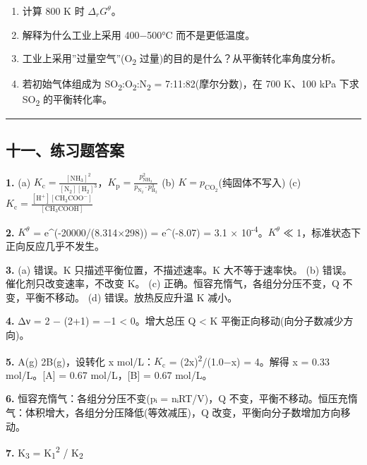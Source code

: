 \begin{enumerate}
\def\labelenumi{(\alph{enumi})}
\tightlist
\item
  计算 800 K 时 \(\Delta_r G^\theta\)。
\item
  解释为什么工业上采用 400−500°C 而不是更低温度。
\item
  工业上采用''过量空气''(O\textsubscript{2} 过量)的目的是什么？从平衡转化率角度分析。
\item
  若初始气体组成为 SO\textsubscript{2}:O\textsubscript{2}:N\textsubscript{2} = 7:11:82(摩尔分数)，在 700 K、100 kPa 下求 SO\textsubscript{2} 的平衡转化率。
\end{enumerate}

\begin{center}\rule{0.5\linewidth}{0.5pt}\end{center}

\subsection{十一、练习题答案}\label{ux5341ux4e00ux7ec3ux4e60ux9898ux7b54ux6848}

\textbf{1.}
(a) \(K_{\mathrm c} = \frac{[\mathrm{NH_3}]^2}{[\mathrm{N_2}][\mathrm{H_2}]^3}\)，\(K_{\mathrm p} = \frac{p_{\mathrm{NH_3}}^2}{p_{\mathrm{N_2}} \cdot p_{\mathrm{H_2}}^3}\)
(b) \(K = p_{\mathrm{CO_2}}\)(纯固体不写入)
(c) \(K_{\mathrm c} = \frac{[\mathrm{H^+}][\mathrm{CH_3COO^-}]}{[\mathrm{CH_3COOH}]}\)

\textbf{2.} \(K^\theta\) = e\^{}(-20000/(8.314×298)) = e\^{}(-8.07) = 3.1 × 10\textsuperscript{-4}。\(K^\theta\) ≪ 1，标准状态下正向反应几乎不发生。

\textbf{3.}
(a) 错误。K 只描述平衡位置，不描述速率。K 大不等于速率快。
(b) 错误。催化剂只改变速率，不改变 K。
(c) 正确。恒容充惰气，各组分分压不变，Q 不变，平衡不移动。
(d) 错误。放热反应升温 K 减小。

\textbf{4.} Δν = 2 − (2+1) = −1 \textless{} 0。增大总压 \箭 Q \textless{} K \箭 平衡正向移动(向分子数减少方向)。

\textbf{5.} A(g) \衡 2B(g)，设转化 x mol/L：\(K_{\mathrm c}\) = (2x)\textsuperscript{2}/(1.0−x) = 4。解得 x = 0.33 mol/L。{[}A{]} = 0.67 mol/L，{[}B{]} = 0.67 mol/L。

\textbf{6.} 恒容充惰气：各组分分压不变(pᵢ = nᵢRT/V)，Q 不变，平衡不移动。恒压充惰气：体积增大，各组分分压降低(等效减压)，Q 改变，平衡向分子数增加方向移动。

\textbf{7.} K\textsubscript{3} = K\textsubscript{1}\textsuperscript{2} / K\textsubscript{2}

